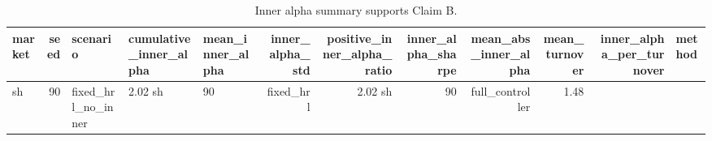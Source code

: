 \begin{table}
\caption{Inner alpha summary supports Claim B.}
\begin{tabular}{lrlllrrrrrrl}
\toprule
market & seed & scenario & cumulative_inner_alpha & mean_inner_alpha & inner_alpha_std & positive_inner_alpha_ratio & inner_alpha_sharpe & mean_abs_inner_alpha & mean_turnover & inner_alpha_per_turnover & method \\
\midrule
sh & 90 & fixed_hrl_no_inner & 2.02%
sh & 90 & fixed_hrl & 2.02%
sh & 90 & full_controller & 1.48%
\bottomrule
\end{tabular}
\end{table}
